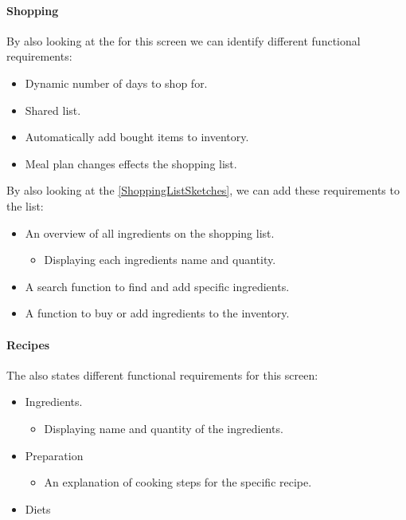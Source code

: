 \paragraph{Shopping}
By also looking at the  for this screen we can identify different functional requirements:

\begin{itemize}
	\item Dynamic number of days to shop for.
	\item Shared list.
	\item Automatically add bought items to inventory.
	\item Meal plan changes effects the shopping list.
\end{itemize} 

By also looking at the  \cref{ShoppingListSketches}, we can add these requirements to the list:

\begin{itemize}
	\item An overview of all ingredients on the shopping list.
		\begin{itemize}
			\item Displaying each ingredients name and quantity.
		\end{itemize}		 
	\item A search function to find and add specific ingredients.
	\item A function to buy or add ingredients to the inventory.	
\end{itemize}

\paragraph{Recipes}
The  also states different functional requirements for this screen:

\begin{itemize}
	\item Ingredients.
		\begin{itemize}
			\item Displaying name and quantity of the ingredients.
		\end{itemize}
	\item Preparation
		\begin{itemize}
			\item An explanation of cooking steps for the specific recipe.
		\end{itemize}
	\item Diets
\end{itemize} 

